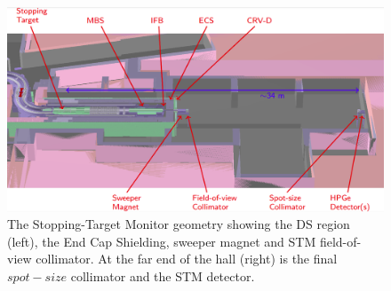 \begin{figure}[!h]
\centering
\includegraphics[width =\textwidth]{figures/png/Screenshot_20240306_180910.png}
\caption{The Stopping-Target Monitor geometry showing the DS region (left), the End Cap Shielding, sweeper magnet and STM field-of-view collimator. At the far end of the hall (right) is the final $spot-size$ collimator and the STM detector.}
\label{fig:stm}
\end{figure}

